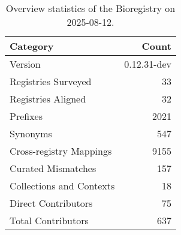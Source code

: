 \begin{table}
\caption{Overview statistics of the Bioregistry on 2025-08-12.}
\label{tab:bioregistry-summary}
\begin{tabular}{lr}
\toprule
Category & Count \\
\midrule
Version & 0.12.31-dev \\
Registries Surveyed & 33 \\
Registries Aligned & 32 \\
Prefixes & 2021 \\
Synonyms & 547 \\
Cross-registry Mappings & 9155 \\
Curated Mismatches & 157 \\
Collections and Contexts & 18 \\
Direct Contributors & 75 \\
Total Contributors & 637 \\
\bottomrule
\end{tabular}
\end{table}
